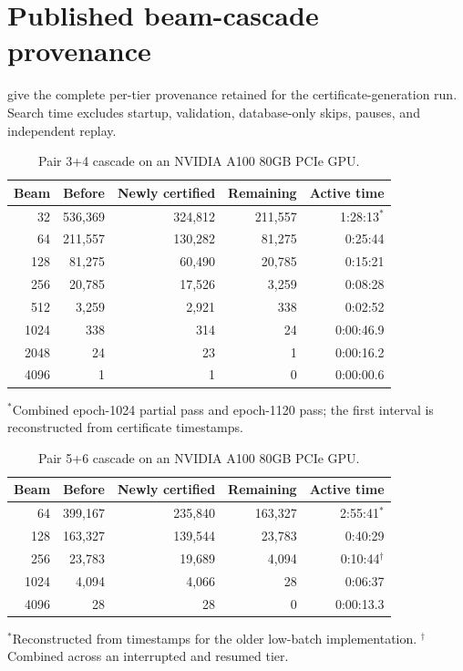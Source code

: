 \section{Published beam-cascade provenance}
\label{app:cascade}

 give the complete
per-tier provenance retained for the certificate-generation run.  Search time excludes
startup, validation, database-only skips, pauses, and independent replay.

\begin{table}[!ht]
\centering
\caption{Pair 3+4 cascade on an NVIDIA A100 80GB PCIe GPU.}
\label{tab:pair34-cascade-full}
\small
\begin{tabular}{@{}rrrrr@{}}
\toprule
Beam & Before & Newly certified & Remaining & Active time \\
\midrule
32   & 536,369 & 324,812 & 211,557 & 1:28:13$^{*}$ \\
64   & 211,557 & 130,282 & 81,275  & 0:25:44 \\
128  & 81,275  & 60,490  & 20,785  & 0:15:21 \\
256  & 20,785  & 17,526  & 3,259   & 0:08:28 \\
512  & 3,259   & 2,921   & 338     & 0:02:52 \\
1024 & 338     & 314     & 24      & 0:00:46.9 \\
2048 & 24      & 23      & 1       & 0:00:16.2 \\
4096 & 1       & 1       & 0       & 0:00:00.6 \\
\bottomrule
\end{tabular}
\par\smallskip
\footnotesize $^{*}$Combined epoch-1024 partial pass and epoch-1120 pass;
the first interval is reconstructed from certificate timestamps.
\end{table}

\begin{table}[h]
\centering
\caption{Pair 5+6 cascade on an NVIDIA A100 80GB PCIe GPU.}
\label{tab:pair56-cascade-full}
\small
\begin{tabular}{@{}rrrrr@{}}
\toprule
Beam & Before & Newly certified & Remaining & Active time \\
\midrule
64   & 399,167 & 235,840 & 163,327 & 2:55:41$^{*}$ \\
128  & 163,327 & 139,544 & 23,783  & 0:40:29 \\
256  & 23,783  & 19,689  & 4,094   & 0:10:44$^{\dagger}$ \\
1024 & 4,094   & 4,066   & 28      & 0:06:37 \\
4096 & 28      & 28      & 0       & 0:00:13.3 \\
\bottomrule
\end{tabular}
\par\smallskip
\footnotesize $^{*}$Reconstructed from timestamps for the older low-batch
implementation.  $^{\dagger}$Combined across an interrupted and resumed tier.
\end{table}

